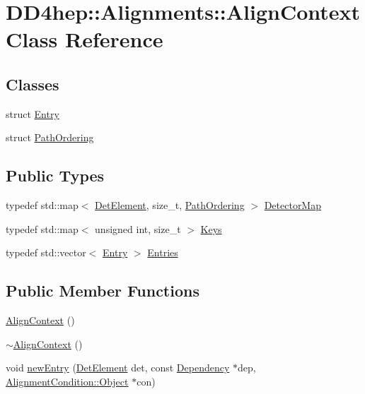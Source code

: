 \hypertarget{class_d_d4hep_1_1_alignments_1_1_align_context}{}\section{D\+D4hep\+:\+:Alignments\+:\+:Align\+Context Class Reference}
\label{class_d_d4hep_1_1_alignments_1_1_align_context}
\subsection*{Classes}
\begin{DoxyCompactItemize}
\item 
struct \hyperlink{struct_d_d4hep_1_1_alignments_1_1_align_context_1_1_entry}{Entry}
\item 
struct \hyperlink{struct_d_d4hep_1_1_alignments_1_1_align_context_1_1_path_ordering}{Path\+Ordering}
\end{DoxyCompactItemize}
\subsection*{Public Types}
\begin{DoxyCompactItemize}
\item 
typedef std\+::map$<$ \hyperlink{class_d_d4hep_1_1_geometry_1_1_det_element}{Det\+Element}, size\+\_\+t, \hyperlink{struct_d_d4hep_1_1_alignments_1_1_align_context_1_1_path_ordering}{Path\+Ordering} $>$ \hyperlink{class_d_d4hep_1_1_alignments_1_1_align_context_a87b50a8f7563aefb2944aebe2d5bb33e}{Detector\+Map}
\item 
typedef std\+::map$<$ unsigned int, size\+\_\+t $>$ \hyperlink{class_d_d4hep_1_1_alignments_1_1_align_context_afed2b1b68f90bb0129bd51a08904332b}{Keys}
\item 
typedef std\+::vector$<$ \hyperlink{struct_d_d4hep_1_1_alignments_1_1_align_context_1_1_entry}{Entry} $>$ \hyperlink{class_d_d4hep_1_1_alignments_1_1_align_context_a1b5a088a6d88177089055193c11aa67c}{Entries}
\end{DoxyCompactItemize}
\subsection*{Public Member Functions}
\begin{DoxyCompactItemize}
\item 
\hyperlink{class_d_d4hep_1_1_alignments_1_1_align_context_a0340e8218e8b1ffc12521b5d17bcdb90}{Align\+Context} ()
\item 
\hyperlink{class_d_d4hep_1_1_alignments_1_1_align_context_ab283a69726f22fa38ab82b93286c9ab9}{$\sim$\+Align\+Context} ()
\item 
void \hyperlink{class_d_d4hep_1_1_alignments_1_1_align_context_aff6f08db18fa6c1ff668371240ee438a}{new\+Entry} (\hyperlink{class_d_d4hep_1_1_geometry_1_1_det_element}{Det\+Element} det, const \hyperlink{namespace_d_d4hep_1_1_alignments_a94aaf200a47dbbcf42c8769eb623ea60}{Dependency} $\ast$dep, \hyperlink{class_d_d4hep_1_1_alignments_1_1_alignment_condition_aad9d743ab04b8eb38063249c6a9e16c0}{Alignment\+Condition\+::\+Object} $\ast$con)
\end{DoxyCompactItemize}
